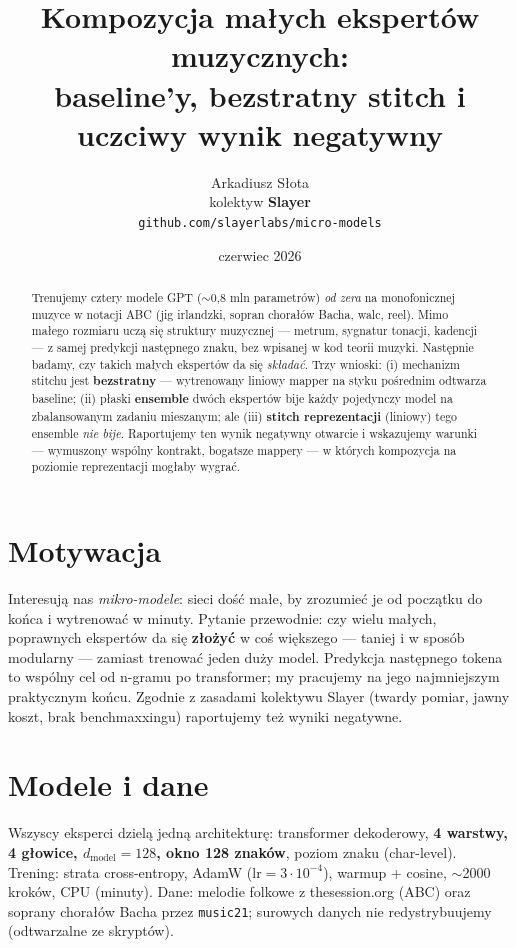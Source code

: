 \documentclass[11pt]{article}
\title{Kompozycja małych ekspertów muzycznych:\\ baseline'y, bezstratny stitch i uczciwy wynik negatywny}
\author{Arkadiusz Słota \\ kolektyw \textbf{Slayer} \\ \texttt{github.com/slayerlabs/micro-models}}
\date{czerwiec 2026}
\begin{document}
\maketitle

\begin{abstract}
Trenujemy cztery modele GPT ($\sim$0{,}8 mln parametrów) \emph{od zera} na monofonicznej muzyce w notacji ABC
(jig irlandzki, sopran chorałów Bacha, walc, reel). Mimo małego rozmiaru uczą się struktury muzycznej --- metrum,
sygnatur tonacji, kadencji --- z samej predykcji następnego znaku, bez wpisanej w kod teorii muzyki. Następnie
badamy, czy takich małych ekspertów da się \emph{składać}. Trzy wnioski: (i) mechanizm stitchu jest
\textbf{bezstratny} --- wytrenowany liniowy mapper na styku pośrednim odtwarza baseline; (ii) płaski
\textbf{ensemble} dwóch ekspertów bije każdy pojedynczy model na zbalansowanym zadaniu mieszanym; ale
(iii) \textbf{stitch reprezentacji} (liniowy) tego ensemble \emph{nie bije}. Raportujemy ten wynik negatywny
otwarcie i wskazujemy warunki --- wymuszony wspólny kontrakt, bogatsze mappery --- w których kompozycja na
poziomie reprezentacji mogłaby wygrać.
\end{abstract}

\section{Motywacja}
Interesują nas \emph{mikro-modele}: sieci dość małe, by zrozumieć je od początku do końca i wytrenować w minuty.
Pytanie przewodnie: czy wielu małych, poprawnych ekspertów da się \textbf{złożyć} w coś większego --- taniej i
w sposób modularny --- zamiast trenować jeden duży model. Predykcja następnego tokena to wspólny cel od n-gramu
po transformer; my pracujemy na jego najmniejszym praktycznym końcu. Zgodnie z zasadami kolektywu Slayer
(twardy pomiar, jawny koszt, brak benchmaxxingu) raportujemy też wyniki negatywne.

\section{Modele i dane}
Wszyscy eksperci dzielą jedną architekturę: transformer dekoderowy, \textbf{4 warstwy, 4 głowice,
$d_\text{model}=128$, okno 128 znaków}, poziom znaku (char-level). Trening: strata cross-entropy, AdamW
($\text{lr}=3\cdot10^{-4}$), warmup + cosine, $\sim$2000 kroków, CPU (minuty). Dane: melodie folkowe z
thesession.org (ABC) oraz soprany chorałów Bacha przez \texttt{music21}; surowych danych nie redystrybuujemy
(odtwarzalne ze skryptów).
\end{document}
